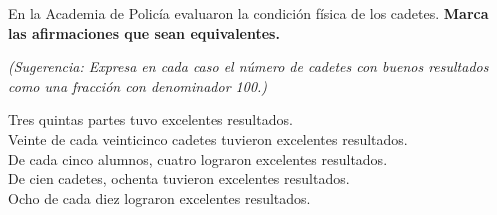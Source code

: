 En la Academia de Policía evaluaron la condición física de los cadetes.
\textbf{Marca las afirmaciones que sean equivalentes.}

\emph{(Sugerencia: Expresa en cada caso el número de cadetes con buenos resultados como una fracción
    con denominador 100.)}

\begin{checkboxes}
    \choice Tres quintas partes tuvo excelentes resultados.\\
    \choice Veinte de cada veinticinco cadetes tuvieron excelentes resultados.\\
    \choice De cada cinco alumnos, cuatro lograron excelentes resultados.\\
    \choice De cien cadetes, ochenta tuvieron excelentes resultados.\\
    \choice Ocho de cada diez lograron excelentes resultados.\\
\end{checkboxes}
